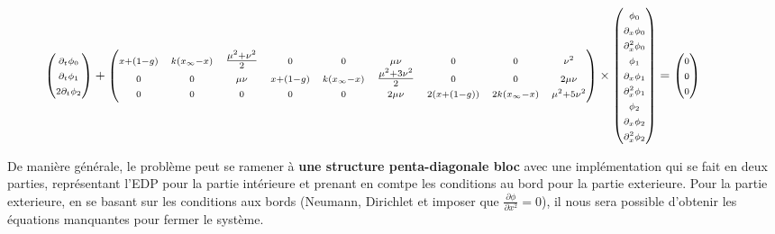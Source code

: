 \documentclass[a4paper,oneside,11pt]{article}
\newcommand{\dr}{\ensuremath{\partial}}
\begin{document}
$$
\hspace*{-0.1\textwidth}
\begin{pmatrix}
\scriptstyle \dr_t \phi_0 \\
\scriptstyle \dr_t \phi_1 \\
\scriptstyle 2 \dr_t \phi_2
\end{pmatrix}  
+
\begin{pmatrix} 
\scriptstyle x +(1-g) & \scriptstyle k(x_{\infty}-x) &  \frac{\mu^{2}+\nu^{2}}{2} & \scriptstyle 0 & \scriptstyle 0 & \scriptstyle \mu \nu & \scriptstyle 0 & \scriptstyle 0 & \scriptstyle \nu^2\\
\scriptstyle 0 & \scriptstyle 0 & \scriptstyle \mu \nu & \scriptstyle x + (1-g) & \scriptstyle k(x_{\infty}-x) &  \frac{\mu^{2}+3\nu^{2}}{2} & \scriptstyle 0 & \scriptstyle 0 & \scriptstyle 2\mu \nu \\
\scriptstyle 0 & \scriptstyle 0 & \scriptstyle 0 & \scriptstyle 0 & \scriptstyle 0 & \scriptstyle 2 \mu \nu & \scriptstyle 2(x+(1-g)) & \scriptstyle 2k(x_{\infty}-x) & \scriptstyle \mu^2 + 5 \nu^2 
\end{pmatrix}
\times 
\begin{pmatrix}
\scriptstyle \phi_0 \\
\scriptstyle \dr_x \phi_0 \\
\scriptstyle \dr_x^2 \phi_0 \\
\scriptstyle \phi_1 \\
\scriptstyle \dr_x \phi_1 \\
\scriptstyle \dr_x^2 \phi_1 \\
\scriptstyle \phi_2 \\
\scriptstyle \dr_x \phi_2 \\
\scriptstyle \dr_x^2 \phi_2 
\end{pmatrix}
= \begin{pmatrix}
\scriptstyle 0 \\ \scriptstyle 0 \\ \scriptstyle 0
\end{pmatrix}
$$

De manière générale, le problème peut se ramener à \textbf{une structure penta-diagonale bloc} avec une implémentation qui se fait en deux parties, représentant l'EDP pour la partie intérieure et prenant en comtpe les conditions au bord pour la partie exterieure. \newline
Pour la partie exterieure, en se basant sur les conditions aux bords (Neumann, Dirichlet et imposer que $\frac{\partial \phi}{\partial x^2}=0$), il nous sera possible d'obtenir les équations manquantes pour fermer le système.
\end{document}
